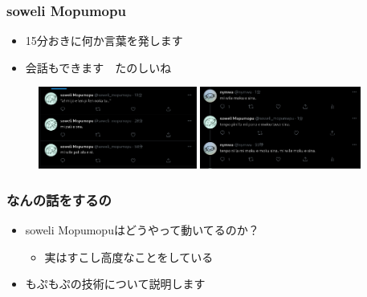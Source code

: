 \documentclass[14pt]{beamer}
\begin{document}
\begin{frame}
	\frametitle{soweli Mopumopu}
	
	\begin{itemize}
		\item 15分おきに何か言葉を発します
		\item 会話もできます　たのしいね
	\end{itemize}
	
	\begin{figure}[H]
		\centering
		\begin{minipage}{0.45\linewidth}
			\includegraphics[height=2.7cm]{mopu1.png}
		\end{minipage}
		\begin{minipage}{0.45\linewidth}
			\includegraphics[height=2.7cm]{mopu2.png}
		\end{minipage}
	\end{figure}
\end{frame}

\begin{frame}
	\frametitle{なんの話をするの}

	\begin{itemize}
		\item soweli Mopumopuはどうやって動いてるのか？
			\begin{itemize}
				\item 実はすこし高度なことをしている
			\end{itemize}
		\item もぷもぷの技術について説明します
	\end{itemize}
\end{frame}
\end{document}
